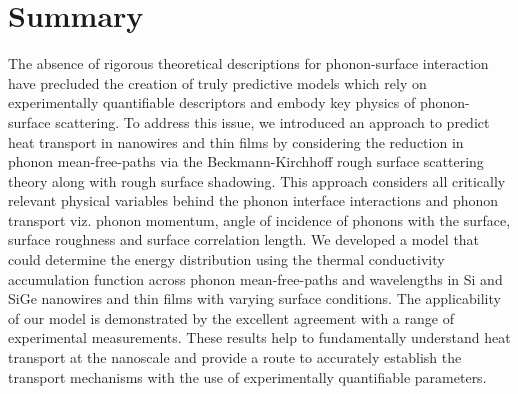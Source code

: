 \section{Summary}
The absence of rigorous theoretical descriptions for phonon-surface interaction have precluded the creation of truly predictive models which rely on experimentally quantifiable descriptors and embody key physics of phonon-surface scattering. To address this issue, we introduced an approach to predict heat transport in nanowires and thin films by considering the reduction in phonon mean-free-paths via the Beckmann-Kirchhoff rough surface scattering theory along with rough surface shadowing. This approach considers all critically relevant physical variables behind the phonon interface interactions and phonon transport viz. phonon momentum, angle of incidence of phonons with the surface, surface roughness and surface correlation length. We developed a model that could determine the energy distribution using the thermal conductivity accumulation function across phonon mean-free-paths and wavelengths in Si and SiGe nanowires and thin films with varying surface conditions. The applicability of our model is demonstrated by the excellent agreement with a range of experimental measurements. These results help to fundamentally understand heat transport at the nanoscale and provide a route to accurately establish the transport mechanisms with the use of experimentally quantifiable parameters.	